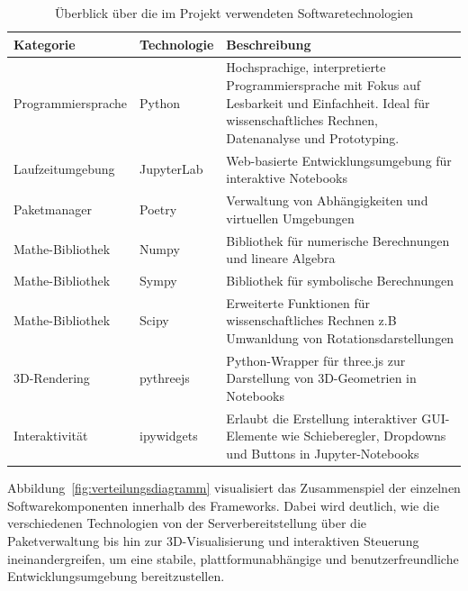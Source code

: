 \vspace{1em}
    \begin{table}[H]
        \centering
        \begin{tabular}{|p{3.5cm}|p{2cm}|p{8cm}|}
        \hline
        Kategorie                   & Technologie                   & Beschreibung  \\ \hline
        Programmiersprache          & Python                        & Hochsprachige, interpretierte Programmiersprache mit Fokus auf Lesbarkeit und Einfachheit. Ideal für wissenschaftliches Rechnen, Datenanalyse und Prototyping.        \\ \hline
        Laufzeitumgebung            & JupyterLab                    & Web-basierte Entwicklungsumgebung für interaktive Notebooks        \\ \hline
        Paketmanager                & Poetry                        & Verwaltung von Abhängigkeiten und virtuellen Umgebungen        \\ \hline
        Mathe-Bibliothek            & Numpy                         & Bibliothek für numerische Berechnungen und lineare Algebra        \\ \hline
        Mathe-Bibliothek            & Sympy                         & Bibliothek für symbolische Berechnungen        \\ \hline
        Mathe-Bibliothek            & Scipy                         & Erweiterte Funktionen für wissenschaftliches Rechnen z.B Umwanldung von Rotationsdarstellungen        \\ \hline
        3D-Rendering                & pythreejs                     & Python-Wrapper für three.js zur Darstellung von 3D-Geometrien in Notebooks        \\ \hline
        Interaktivität              & ipywidgets                    & Erlaubt die Erstellung interaktiver GUI-Elemente wie Schieberegler, Dropdowns und Buttons in Jupyter-Notebooks        \\ \hline
        \end{tabular}
        \caption{Überblick über die im Projekt verwendeten Softwaretechnologien}
        \label{tab:technologien}
    \end{table}
\vspace{1em}



Abbildung~\ref{fig:verteilungsdiagramm} visualisiert das Zusammenspiel der einzelnen Softwarekomponenten innerhalb des Frameworks.
Dabei wird deutlich, wie die verschiedenen Technologien von der Serverbereitstellung über die Paketverwaltung bis hin zur 3D-Visualisierung
und interaktiven Steuerung ineinandergreifen, um eine stabile, plattformunabhängige und benutzerfreundliche Entwicklungsumgebung bereitzustellen.

